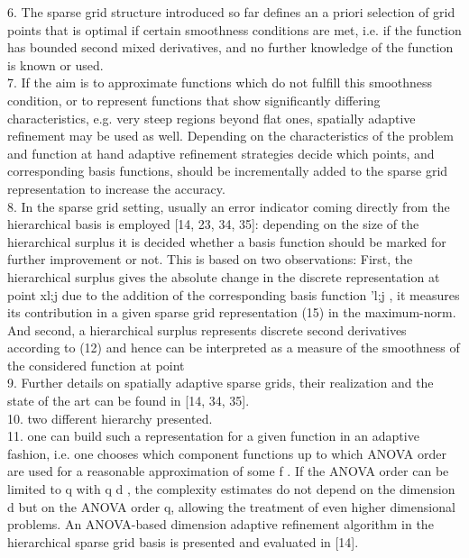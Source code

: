 6. The sparse grid structure introduced so far defines an a priori selection of grid points that is optimal if certain smoothness conditions are met, i.e. if the function has bounded second mixed derivatives, and no further knowledge of the function is known or used.\cite{Garcke2013}\\

7. If the aim is to approximate functions which do not fulfill this smoothness condition, or to represent functions that show significantly differing characteristics, e.g. very steep regions beyond flat ones, spatially adaptive refinement may be used as well. Depending on the characteristics of the problem and function at hand adaptive refinement strategies decide which points, and corresponding basis functions, should be incrementally added to the sparse grid representation to increase the accuracy.\cite{Garcke2013}\\

8. In the sparse grid setting, usually an error indicator coming directly from the hierarchical basis is employed [14, 23, 34, 35]: depending on the size of the hierarchical surplus it is decided whether a basis function should be marked for further improvement or not. This is based on two observations: First, the hierarchical surplus gives the absolute change in the discrete representation at point xl;j due to the addition of the corresponding basis function 'l;j , it measures its contribution in a given sparse grid representation (15) in the maximum-norm. And second, a hierarchical surplus represents discrete second derivatives according to (12) and hence can be interpreted as a measure of the smoothness of the considered function at point \cite{Garcke2013}\\

9. Further details on spatially adaptive sparse grids, their realization and the state of the art can be found in [14, 34, 35].\cite{Garcke2013}\\

10. two different hierarchy presented.\cite{Garcke2013}\\

11. one can build such a representation for a given function in an adaptive fashion, i.e. one chooses which component functions up to which ANOVA order are used for a reasonable approximation of some f . If the ANOVA order can be limited to q with q   d , the complexity estimates do not depend on the dimension d but on the ANOVA order q, allowing the treatment of even higher dimensional problems. An ANOVA-based dimension adaptive refinement algorithm in the hierarchical sparse grid basis is presented and evaluated in [14].\cite{Garcke2013}\\

